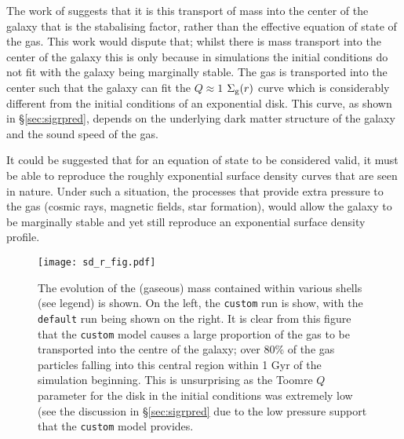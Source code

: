 The work of \citet{krumholz_is_2016} suggests that it is this transport of mass into the center of the galaxy that is the stabalising factor, rather than the effective equation of state of the gas.
This work would dispute that; whilst there is mass transport into the center of the galaxy this is only because in simulations the initial conditions do not fit with the galaxy being marginally stable.
The gas is transported into the center such that the galaxy can fit the $Q\approx1$ $\Sigma_\mathrm{g}(r)$ curve which is considerably different from the initial conditions of an exponential disk.
This curve, as shown in \S \ref{sec:sigrpred}, depends on the underlying dark matter structure of the galaxy and the sound speed of the gas.

It could be suggested that for an equation of state to be considered valid, it must be able to reproduce the roughly exponential surface density curves that are seen in nature.
Under such a situation, the processes that provide extra pressure to the gas (cosmic rays, magnetic fields, star formation), would allow the galaxy to be marginally stable and yet still reproduce an exponential surface density profile.

\begin{figure}[!ht]
    \centering
    \texttt{[image: sd\_r\_fig.pdf]}
    \caption{The evolution of the (gaseous) mass contained within various shells (see legend) is shown. On the left, the {\tt custom} run is show, with the {\tt default} run being shown on the right. It is clear from this figure that the {\tt custom} model causes a large proportion of the gas to be transported into the centre of the galaxy; over 80\% of the gas particles falling into this central region within 1 Gyr of the simulation beginning. This is unsurprising as the Toomre $Q$ parameter for the disk in the initial conditions was extremely low (see the discussion in \S \ref{sec:sigrpred} due to the low pressure support that the {\tt custom} model provides.}
    \label{fig:sd_r_evo}
\end{figure}

